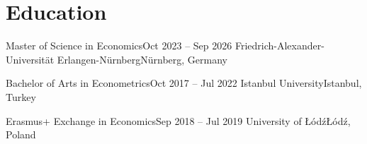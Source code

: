 \section{Education}
    \resumeSubHeadingListStart

    \resumeSubheading
    {Master of Science in Economics}{Oct 2023 -- Sep 2026}
    {Friedrich-Alexander-Universität Erlangen-Nürnberg}{Nürnberg, Germany}
    \resumeItemListStart
    \resumeItemListEnd

        \resumeSubheading
    {Bachelor of Arts in Econometrics}{Oct 2017 -- Jul 2022}
    {Istanbul University}{Istanbul, Turkey}

        \resumeSubheading
    {Erasmus+ Exchange in Economics}{Sep 2018 -- Jul 2019}
    {University of Łódź}{Łódź, Poland}

    \resumeSubHeadingListEnd
